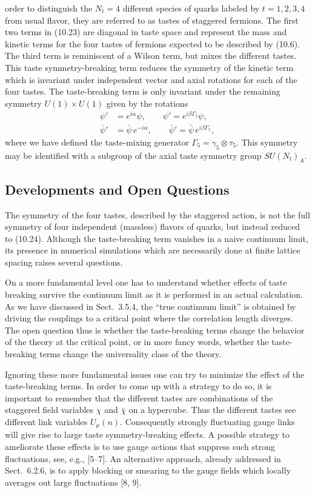 order to distinguish the $N_t = 4$ different species of quarks labeled by
$t = 1, 2, 3, 4$ from usual flavor, they are referred to as tastes of
staggered fermions. The first two terms in (10.23) are diagonal in taste space
and represent the mass and kinetic terms for the four tastes of fermions
expected to be described by (10.6). The third term is reminiscent of a Wilson
term, but mixes the different tastes. This taste symmetry-breaking term
reduces the symmetry of the kinetic term which is invariant under independent
vector and axial rotations for each of the four tastes. The taste-breaking
term is only invariant under the remaining symmetry $U(1) \times U(1)$ given
by the rotations
\begin{equation}
  \begin{split}
    \psi' &= e^{i\alpha}\psi , \qquad \psi' = e^{i\beta\Gamma_5}\psi , \\
    \bar\psi' &= \bar\psi\, e^{-i\alpha} , \qquad
    \bar\psi' = \bar\psi\, e^{i\beta\Gamma_5} ,
  \end{split}
\end{equation}
where we have defined the taste-mixing generator $\Gamma_5 = \gamma_5 \otimes
\tau_5$. This symmetry may be identified with a subgroup of the axial taste
symmetry group $SU(N_t)_A$.

\subsection{Developments and Open Questions}

The symmetry of the four tastes, described by the staggered action, is not the
full symmetry of four independent (massless) flavors of quarks, but instead
reduced to (10.24). Although the taste-breaking term vanishes in a naive
continuum limit, its presence in numerical simulations which are necessarily
done at finite lattice spacing raises several questions.

On a more fundamental level one has to understand whether effects of taste
breaking survive the continuum limit as it is performed in an actual
calculation. As we have discussed in Sect.~3.5.4, the ``true continuum
limit'' is obtained by driving the couplings to a critical point where the
correlation length diverges. The open question thus is whether the
taste-breaking terms change the behavior of the theory at the critical point,
or in more fancy words, whether the taste-breaking terms change the
universality class of the theory.

Ignoring these more fundamental issues one can try to minimize the effect of
the taste-breaking terms. In order to come up with a strategy to do so, it is
important to remember that the different tastes are combinations of the
staggered field variables $\chi$ and $\bar\chi$ on a hypercube. Thus the
different tastes see different link variables $U_\mu(n)$. Consequently
strongly fluctuating gauge links will give rise to large taste
symmetry-breaking effects. A possible strategy to ameliorate these effects is
to use gauge actions that suppress such strong fluctuations, see, e.g.,
[5--7]. An alternative approach, already addressed in Sect.~6.2.6, is to apply
blocking or smearing to the gauge fields which locally averages out large
fluctuations [8, 9].

